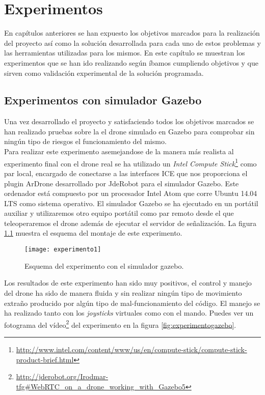 \chapter{Experimentos}

En capítulos anteriores se han expuesto los objetivos marcados para la realización del proyecto así como la solución desarrollada para cada uno de estos problemas y las herramientas utilizadas para los mismos. En este capítulo se muestran los experimentos que se han ido realizando según íbamos cumpliendo objetivos y que sirven como validación experimental de la solución programada.\\

\section{Experimentos con simulador Gazebo}

Una vez desarrollado el proyecto y satisfaciendo todos los objetivos marcados se han realizado pruebas sobre la el drone simulado en Gazebo para comprobar sin ningún tipo de riesgos el funcionamiento del mismo.\\

Para realizar este experimento asemejandose de la manera más realista al experimento final con el drone real se ha utilizado un \emph{Intel Compute Stick}\footnote{\url{http://www.intel.com/content/www/us/en/compute-stick/compute-stick-product-brief.html}} como par local, encargado de conectarse a las interfaces ICE que nos proporciona el plugin ArDrone desarrollado por JdeRobot para el simulador Gazebo. Este ordenador está compuesto por un procesador Intel Atom que corre Ubuntu 14.04 LTS como sistema operativo. El simulador Gazebo se ha ejecutado en un portátil auxiliar y utilizaremos otro equipo portátil como par remoto desde el que teleoperaremos el drone además de ejecutar el servidor de señalización. La figura \ref{fig:esquemaexperimento1} muestra el esquema del montaje de este experimento. \\

\begin{figure}[h!]
\centering
\texttt{[image: experimento1]}
\caption{Esquema del experimento con el simulador gazebo.}
\label{fig:esquemaexperimento1}
\end{figure}

Los resultados de este experimento han sido muy positivos, el control y manejo del drone ha sido de manera fluida y sin realizar ningún tipo de movimiento extraño producido por algún tipo de mal-funcionamiento del código. El manejo se ha realizado tanto con los \emph{joysticks} virtuales como con el mando. Puedes ver un fotograma del vídeo\footnote{\url{http://jderobot.org/Irodmar-tfg#WebRTC_on_a_drone_working_with_Gazebo5}} del experimento en la figura \ref{fig:experimentogazebo}.\\

